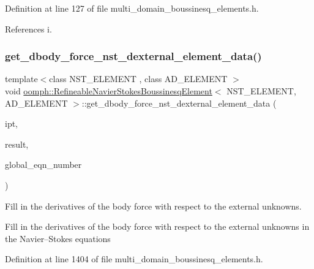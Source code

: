 Definition at line 127 of file multi\+\_\+domain\+\_\+boussinesq\+\_\+elements.\+h.



References i.

\mbox{\label{classoomph_1_1RefineableNavierStokesBoussinesqElement_a4450f88be1c003160b9fa99df70a923b}} 
\subsubsection{\texorpdfstring{get\+\_\+dbody\+\_\+force\+\_\+nst\+\_\+dexternal\+\_\+element\+\_\+data()}{get\_dbody\_force\_nst\_dexternal\_element\_data()}}
{\footnotesize\ttfamily template$<$class N\+S\+T\+\_\+\+E\+L\+E\+M\+E\+NT , class A\+D\+\_\+\+E\+L\+E\+M\+E\+NT $>$ \\
void \hyperlink{classoomph_1_1RefineableNavierStokesBoussinesqElement}{oomph\+::\+Refineable\+Navier\+Stokes\+Boussinesq\+Element}$<$ N\+S\+T\+\_\+\+E\+L\+E\+M\+E\+NT, A\+D\+\_\+\+E\+L\+E\+M\+E\+NT $>$\+::get\+\_\+dbody\+\_\+force\+\_\+nst\+\_\+dexternal\+\_\+element\+\_\+data (\begin{DoxyParamCaption}\item[{const unsigned \&}]{ipt,  }\item[{\hyperlink{classoomph_1_1DenseMatrix}{Dense\+Matrix}$<$ double $>$ \&}]{result,  }\item[{\hyperlink{classoomph_1_1Vector}{Vector}$<$ unsigned $>$ \&}]{global\+\_\+eqn\+\_\+number }\end{DoxyParamCaption})}



Fill in the derivatives of the body force with respect to the external unknowns. 

Fill in the derivatives of the body force with respect to the external unknowns in the Navier--Stokes equations 

Definition at line 1404 of file multi\+\_\+domain\+\_\+boussinesq\+\_\+elements.\+h.




